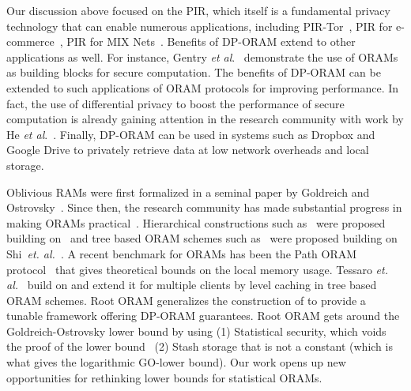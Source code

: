 \documentclass[USenglish,oneside,twocolumn]{article}
\makeatletter
\newcommand{\ourprotocol}{Root ORAM}
\newcommand{\etal}{\textit{et al}.}
\let\origsection\section
\renewcommand\section{\@ifstar{\starsection}{\nostarsection}}
\newcommand\nostarsection[1]
{\sectionprelude\origsection{#1}\sectionpostlude}
\newcommand\starsection[1]
{\sectionprelude\origsection*{#1}\sectionpostlude}
\newcommand\sectionprelude{\vspace{-1em}
}
\newcommand\sectionpostlude{\vspace{-1em}
}
\let\origsubsection\subsection
\renewcommand\subsection{\@ifstar{\starsubsection}{\nostarsubsection}}
\newcommand\nostarsubsection[1]
{\subsectionprelude\origsubsection{#1}\subsectionpostlude}
\newcommand\starsubsection[1]
{\subsectionprelude\origsubsection*{#1}\subsectionpostlude}
\newcommand\subsectionprelude{\vspace{-1.5em}}
\newcommand\subsectionpostlude{\vspace{-1em}}
\makeatother
\begin{document}
\subsection{Other Applications}
Our discussion above focused on the PIR, which itself is a fundamental privacy technology that can enable numerous applications, including PIR-Tor~\cite{pirtor}, PIR for e-commerce~\cite{henry2011practical}, PIR for MIX Nets~\cite{kesdogan2002unobservable}. Benefits of DP-ORAM extend to other applications as well. For instance, Gentry \etal~\cite{gentryoramSC} demonstrate the use of ORAMs as building blocks for secure computation. The benefits of DP-ORAM can be extended to such applications of ORAM protocols for improving performance. In fact, the use of differential privacy to boost the performance of secure computation is already gaining attention in the research community with work by He \etal~\cite{ashwinDPSMC}. Finally, DP-ORAM can be used in systems such as Dropbox and Google Drive to privately retrieve data at low network overheads and local storage.














 \section{Related work}\label{sec:relatedwork}





Oblivious RAMs were first formalized in a seminal paper by Goldreich and Ostrovsky~\cite{goldreichoram}. Since then, the research community has made substantial progress in making ORAMs practical~\cite{wsc-bcomp-08,Pinkas2010,gm-paodor-11,GMOT12,pathoram,ringoram,oblivistore}. 
Hierarchical constructions such as~\cite{Pinkas2010,GMOT12,KLO} were proposed building on~\cite{goldreichoram} and tree based ORAM schemes such as~\cite{pathoram,ringoram,gentryoramSC,burstoram,SSSoram,ren15constants,oblivistore} were proposed building on Shi~\textit{et. al.}~\cite{tree_based_orams}. A recent benchmark for ORAMs has been the Path ORAM protocol~\cite{pathoram} that gives theoretical bounds on the local memory usage. Tessaro \textit{et. al.}~\cite{tessarotcc} build on \cite{pathoram} and extend it for multiple clients by level caching in tree based ORAM schemes. \ourprotocol{} generalizes the construction of \cite{pathoram} to provide a tunable framework offering DP-ORAM guarantees. \ourprotocol{} gets around the Goldreich-Ostrovsky lower bound by using (1) Statistical security, which voids the proof of the lower bound~\cite{goldreichoram}
(2) Stash storage that is not a constant (which is what gives the logarithmic GO-lower bound). 
Our work opens up new opportunities for rethinking lower bounds for statistical ORAMs.
\end{document}
